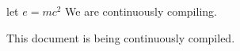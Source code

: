 \documentclass{article}
\begin{document}
    let $e = mc^{2}$
    We are continuously compiling.

    This document is being continuously compiled.
\end{document}
